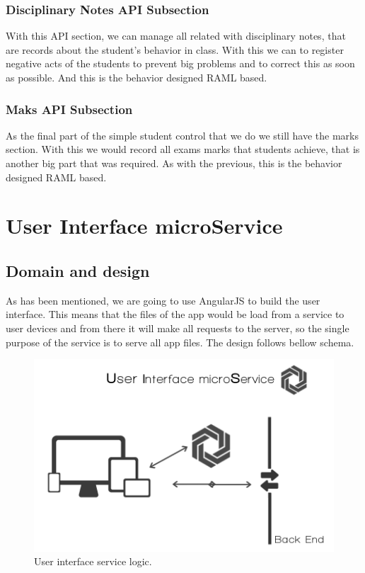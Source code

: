 \subsubsection{Disciplinary Notes API Subsection}

With this API section, we can manage all related with disciplinary notes, that
are records about the student's behavior in class. With this we can to register
negative acts of the students to prevent big problems and to correct this as soon
as possible. And this is the behavior designed RAML based.


\subsubsection{Maks API Subsection}

As the final part of the simple student control that we do we still have the marks
section.  With this we would record all exams marks that students achieve, that
is another big part that was required. As with the previous, this is the
behavior designed RAML based.


\section{User Interface microService}

\subsection{Domain and design}

As has been mentioned, we are going to use AngularJS to build the user interface.
This means that the files of the app would be load from a service to user devices
and from there it will make all requests to the server, so the single purpose of
the service is to serve all app files.
The design follows bellow schema.

\begin{figure}[H]
  \includegraphics[scale=0.4]{img/graphics/ui.png}
  \centering
  \caption{User interface service logic.}
\end{figure}


